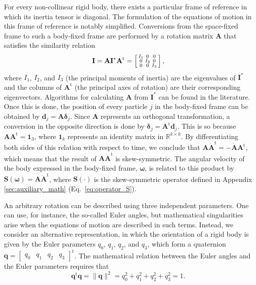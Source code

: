 \documentclass[aip,jcp,reprint,amsmath,amssymb]{revtex4-1}
\makeatletter
\newcommand{\mt}[1]{\boldsymbol{\mathbf{#1}}}           %
\newcommand{\vt}[1]{\boldsymbol{\mathbf{#1}}}           %
\newcommand{\tr}[1]{#1^\text{t}}                               %
\newenvironment{smallarray}[1]
{\null\,\vcenter\bgroup\scriptsize
	\renewcommand{\arraystretch}{0.7}
	\arraycolsep=.13885em
	\hbox\bgroup$\array{@{}#1@{}}}
{\endarray$\egroup\egroup\,\null}
\makeatother
\begin{document}
For every non-collinear rigid body, there exists a particular frame of reference in which its inertia tensor is diagonal. The formulation of the equations of motion in this frame of reference is notably simplified. Conversions from the space-fixed frame to such a body-fixed frame are performed by a rotation matrix $\mt A$ that satisfies the similarity relation\citep{Goldstein2002}
\[
{\mt I} = {\mt A} {\mt I}^\ast \tr{\mt A} = \left[ \begin{smallarray}{ccc}
I_1 &   0 &   0 \\
  0 & I_2 &   0 \\
  0 &   0 & I_3 \\
\end{smallarray} \right],
\]
where $I_1$, $I_2$, and $I_3$ (the principal moments of inertia) are the eigenvalues of ${\mt I}^\ast$ and the columns of $\tr{\mt A}$ (the principal axes of rotation) are their corresponding eigenvectors. Algorithms for calculating $\mt A$ from $\mt I^\ast$ can be found in the literature.\cite{Kopp2008} Once this is done, the position of every particle $j$ in the body-fixed frame can be obtained by ${\vt d}_j = {\mt A} {\vt \delta}_j$. Since $\mt A$ represents an orthogonal transformation, a conversion in the opposite direction is done by ${\vt \delta}_j = \tr{\mt A} {\vt d}_j$.\cite{Goldstein2002} This is so because $\mt A \tr{\mt A} = \mt 1_3$, where $\mt 1_k$ represents an identity matrix in $\mathbb{R}^{k \times k}$. By differentiating both sides of this relation with respect to time, we conclude that ${\mt A} \tr{\dot{\mt A}} = -\dot{\mt A} \tr{\mt A}$, which means that the result of $\mt A \tr{\dot{\mt A}}$ is skew-symmetric. The angular velocity of the body expressed in the body-fixed frame, $\vt \omega$, is related to this product by $\mt S(\vt \omega) = \mt A \tr{\dot{\mt A}}$,\cite{Haug1989} where $\mt S(\cdot)$ is the skew-symmetric operator defined in Appendix \ref{sec:auxiliary_math}  (Eq.~\ref{eq:operator_S}).

An arbitrary rotation can be described using three independent parameters. One can use, for instance, the so-called Euler angles, but mathematical singularities arise when the equations of motion are described in such terms. Instead, we consider an alternative representation, in which the orientation of a rigid body is given by the Euler parameters $q_0$, $q_1$, $q_2$, and $q_3$, which form a quaternion $\vt q = \tr {[\begin{array}{cccc} q_0 & q_1 & q_2 & q_3 \end{array}]}$. The mathematical relation between the Euler angles and the Euler parameters requires that\cite{Goldstein2002}
\begin{equation}
\label{eq:norm_eq_1}
\tr{\vt q}{\vt q} = \|\vt q\|^2 = q_0^2 + q_1^2 + q_2^2 + q_3^2 = 1.
\end{equation}
\end{document}
